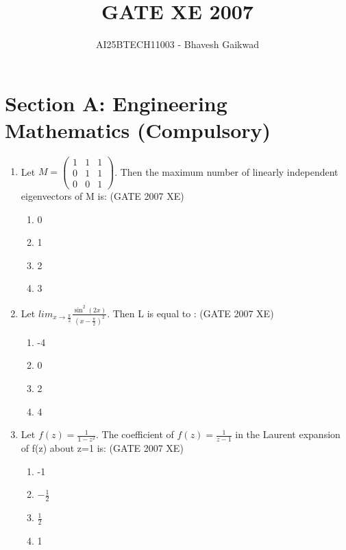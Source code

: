 \documentclass[journal,cmex10]{IEEEtran}
\theoremstyle{remark}
\newcommand{\myvec}[1]{\ensuremath{\begin{pmatrix}#1\end{pmatrix}}}
\numberwithin{equation}{enumi}
\numberwithin{figure}{enumi}
\begin{document}

\vspace{3cm}

\title{GATE XE 2007}
\author{AI25BTECH11003 - Bhavesh Gaikwad}
{\let\newpage\relax\maketitle}

\section*{Section A: Engineering Mathematics (Compulsory)}
\vspace{2\baselineskip}
\begin{enumerate}

    \item Let $M =\myvec{ 1 & 1 & 1 \\ 0 & 1 &1 \\ 0 & 0 &1}$. Then the maximum number of linearly independent eigenvectors of M is:
    \hfill{(GATE 2007 XE)}
    
    \begin{multicols}{4}
    \begin{enumerate}
        \item 0
        \item 1
        \item 2
        \item 3
     \end{enumerate}
     \end{multicols}

    
    \item Let $ lim_{x \to \frac{\pi}{2}} \frac{\sin^{2}(2x)}{\left(x - \frac{\pi}{2}\right)^{2}} $. Then L is equal to :
    \hfill{(GATE 2007 XE)}
    \begin{multicols}{4}
    \begin{enumerate}
        \item -4
        \item 0
        \item 2
        \item 4
    \end{enumerate}
\end{multicols}


    \item Let $ f(z) = \frac{1}{1 - z^{2}} $. The coefficient of  $ f(z) = \frac{1}{z-1} $ in the Laurent expansion of f(z) about z=1 is:
    \hfill{(GATE 2007 XE)}
    \begin{multicols}{4}
    \begin{enumerate}
        \item -1
        \item $-\frac{1}{2}$
        \item $\frac{1}{2}$
        \item 1
    \end{enumerate}
\end{multicols}
    


\end{enumerate}
\end{document}
